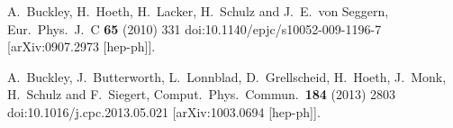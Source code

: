 \documentclass[aps,preprint,floatfix,nofootinbib,showpacs]{revtex4-1}
\begin{document}
\begin{thebibliography}{99}
  A.~Buckley, H.~Hoeth, H.~Lacker, H.~Schulz and J.~E.~von Seggern,
  Eur.\ Phys.\ J.\ C {\bf 65} (2010) 331
  doi:10.1140/epjc/s10052-009-1196-7
  [arXiv:0907.2973 [hep-ph]].

  
  A.~Buckley, J.~Butterworth, L.~Lonnblad, D.~Grellscheid, H.~Hoeth, J.~Monk, H.~Schulz and F.~Siegert,
  Comput.\ Phys.\ Commun.\  {\bf 184} (2013) 2803
  doi:10.1016/j.cpc.2013.05.021
  [arXiv:1003.0694 [hep-ph]].
  

\end{thebibliography}
\end{document}
